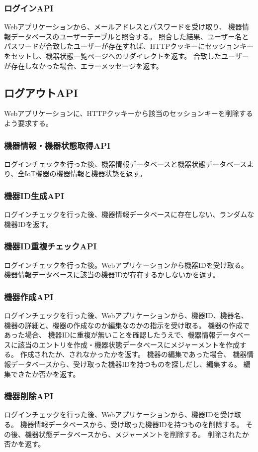 \subsubsection{ログインAPI}
Webアプリケーションから、メールアドレスとパスワードを受け取り、	機器情報データベースのユーザーテーブルと照合する。
照合した結果、ユーザー名とパスワードが合致したユーザーが存在すれば、HTTPクッキーにセッションキーをセットし、機器状態一覧ページへのリダイレクトを返す。
合致したユーザーが存在しなかった場合、エラーメッセージを返す。
\subsection{ログアウトAPI}
Webアプリケーションに、HTTPクッキーから該当のセッションキーを削除するよう要求する。
\subsubsection{機器情報・機器状態取得API}
ログインチェックを行った後、機器情報データベースと機器状態データベースより、全IoT機器の機器情報と機器状態を返す。
\subsubsection{機器ID生成API}
ログインチェックを行った後、機器情報データベースに存在しない、ランダムな機器IDを返す。
\subsubsection{機器ID重複チェックAPI}
ログインチェックを行った後。Webアプリケーションから機器IDを受け取る。
機器情報データベースに該当の機器IDが存在するかしないかを返す。
\subsubsection{機器作成API}
ログインチェックを行った後、Webアプリケーションから、機器ID、機器名、機器の詳細と、機器の作成なのか編集なのかの指示を受け取る。
機器の作成であった場合、
機器IDに重複が無いことを確認したうえで、機器情報データベースに該当のエントリを作成・機器状態データベースにメジャーメントを作成する。
作成されたか、されなかったかを返す。
機器の編集であった場合、
機器情報データベースから、受け取った機器IDを持つものを探しだし、編集する。
編集できたか否かを返す。
\subsubsection{機器削除API}
ログインチェックを行った後、Webアプリケーションから、機器IDを受け取る。
機器情報データベースから、受け取った機器IDを持つものを削除する。
その後、機器状態データベースから、メジャーメントを削除する。
削除されたか否かを返す。
